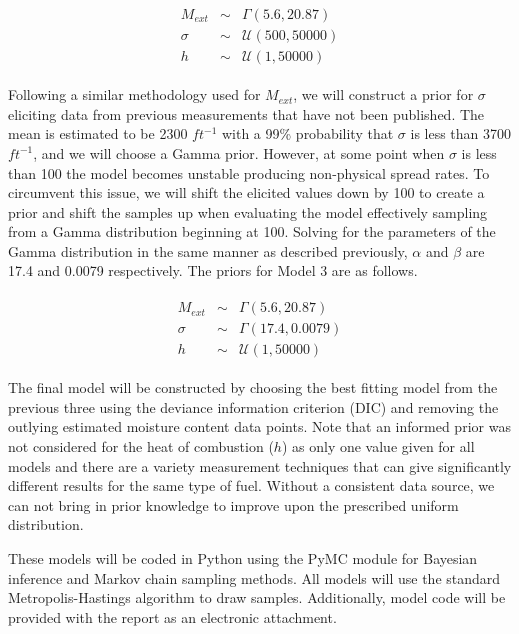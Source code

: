 \documentclass[11pt]{article}
\begin{document}
\begin{align}
\begin{array}{ccc}
M_{ext} &\sim& \Gamma(5.6,20.87) \\
\sigma &\sim& \mathcal{U}(500,50000) \\
h &\sim& \mathcal{U}(1,50000)
\end{array}
\label{eq:mod2_priors}
\end{align}

Following a similar methodology used for $M_{ext}$, we will construct a prior for $\sigma$ eliciting data from previous measurements that have not been published. The mean is estimated to be 2300 $ft^{-1}$ with a 99\% probability that $\sigma$ is less than 3700 $ft^{-1}$, and we will choose a Gamma prior. However, at some point when $\sigma$ is less than 100 the model becomes unstable producing non-physical spread rates. To circumvent this issue, we will shift the elicited values down by 100 to create a prior and shift the samples up when evaluating the model effectively sampling from a Gamma distribution beginning at 100. Solving for the parameters of the Gamma distribution in the same manner as described previously, $\alpha$ and $\beta$ are 17.4 and 0.0079 respectively. The priors for Model 3 are as follows. 

\begin{align}
\begin{array}{ccc}
M_{ext} &\sim& \Gamma(5.6,20.87) \\
\sigma &\sim& \Gamma(17.4,0.0079) \\
h &\sim& \mathcal{U}(1,50000)
\end{array}
\label{eq:mod3_priors}
\end{align}

The final model will be constructed by choosing the best fitting model from the previous three using the deviance information criterion (DIC) and removing the outlying estimated moisture content data points. Note that an informed prior was not considered for the heat of combustion ($h$) as only one value given for all models \cite{scott2005standard} and there are a variety measurement techniques that can give significantly different results for the same type of fuel. Without a consistent data source, we can not bring in prior knowledge to improve upon the prescribed uniform distribution. 

These models will be coded in Python using the PyMC module for Bayesian inference and Markov chain sampling methods. All models will use the standard Metropolis-Hastings algorithm to draw samples. Additionally, model code will be provided with the report as an electronic attachment.
\end{document}
